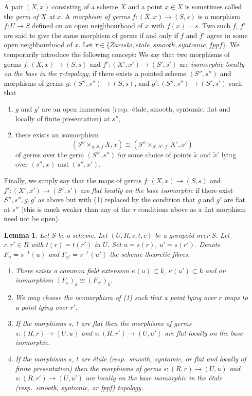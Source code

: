 \documentclass{stacks-project}
\theoremstyle{plain}
\newtheorem{lemma}[subsection]{Lemma}
\theoremstyle{definition}
\theoremstyle{remark}
\numberwithin{equation}{subsection}
\def\etale{{\acute{e}tale}}
\begin{document}
\medskip\noindent
A pair $(X, x)$ consisting of a scheme $X$ and a point $x \in X$ is sometimes
called the {\it germ of $X$ at $x$}.
A {\it morphism of germs} $f : (X, x) \to (S, s)$
is a morphism $f : U \to S$ defined on an open neighbourhood
of $x$ with $f(x) = s$. Two such
$f$, $f'$ are said to give the same morphism of germs
if and only if $f$ and $f'$ agree in some open neighbourhood of $x$.
Let $\tau \in \{Zariski, \etale, smooth, syntomic, fppf\}$.
We temporarily introduce the following concept: We say that two morphisms
of germs $f : (X, x) \to (S, s)$ and $f' : (X', x') \to (S', s')$
are {\it isomorphic locally on the base in the $\tau$-topology},
if there exists a pointed scheme $(S'', s'')$ and morphisms of germs
$g : (S'', s'') \to (S, s)$, and $g' : (S'', s'') \to (S', s')$
such that
\begin{enumerate}
\item $g$ and $g'$ are an open immersion (resp.\ \'etale, smooth, syntomic,
flat and locally of finite presentation) at $s''$,
\item there exists an isomorphism
$$
(S'' \times_{g, S, f} X, \tilde x)
\cong
(S'' \times_{g', S', f'} X', \tilde  x')
$$
of germs over the germ $(S'', s'')$ for some choice of points
$\tilde x$ and $\tilde x'$ lying over $(s'', x)$ and $(s'', x')$.
\end{enumerate}
Finally, we simply say that the maps of germs
$f : (X, x) \to (S, s)$ and $f' : (X', x') \to (S', s')$
are {\it flat locally on the base isomorphic} if there exist
$S'', s'', g, g'$ as above but with (1) replaced by
the condition that $g$ and $g'$ are flat at $s''$ (this is
much weaker than any of the $\tau$ conditions above
as a flat morphism need not be open).

\begin{lemma}
\label{lemma-two-fibres}
Let $S$ be a scheme.
Let $(U, R, s, t, c)$ be a groupoid over $S$.
Let $r, r' \in R$ with $t(r) = t(r')$ in $U$.
Set $u = s(r)$, $u' = s(r')$.
Denote $F_u = s^{-1}(u)$ and $F_{u'} = s^{-1}(u')$ the scheme
theoretic fibres.
\begin{enumerate}
\item There exists a common field extension
$\kappa(u) \subset k$, $\kappa(u') \subset k$ and
an isomorphism $(F_u)_k \cong (F_{u'})_k$.
\item We may choose the isomorphism of (1) such that a point
lying over $r$ maps to a point lying over $r'$.
\item If the morphisms $s$, $t$ are flat then the morphisms of germs
$s : (R, r) \to (U, u)$ and $s : (R, r') \to (U, u')$ are flat
locally on the base isomorphic.
\item If the morphisms $s$, $t$ are \'etale
(resp.\ smooth, syntomic, or flat and locally of finite presentation)
then the morphisms of germs $s : (R, r) \to (U, u)$ and
$s : (R, r') \to (U, u')$ are locally on the base isomorphic
in the \'etale (resp.\ smooth, syntomic, or fppf) topology.
\end{enumerate}
\end{lemma}
\end{document}
